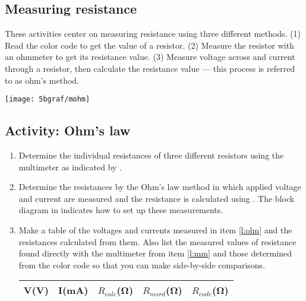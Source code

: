 \begin{multicols}{2}
\section {Measuring resistance}
These activities center on measuring resistance using three different methods. (1) Read the color code to get the value of a resistor. (2) Measure the resistor with an ohmmeter to get  its resistance value. (3) Measure voltage across and current through a resistor, then calculate the resistance value --- this process is  referred to as ohm's method.


\begin{center}
	\texttt{[image: 5bgraf/mohm]} %
	\label{f:mohm}
\end{center}

\subsection{Activity: Ohm's law} \label{s:ohmlaw}
\begin{enumerate}
	\item \label{l:mm} Determine the individual resistances of three different resistors using the multimeter as indicated by .
	
	\item \label{l:olm}Determine the resistances by the Ohm's law method in which applied voltage and current are measured and the resistance is calculated using .  The block diagram in  indicates how to set up these measurements.

	\item Make a table of the voltages and currents measured in item \ref{l:olm} and the resistances calculated from them.  Also list the measured values of resistance found directly with the multimeter from item \ref{l:mm} and those determined from the color code so that you can make side-by-side comparisons.
	
\begin{tabularx}{\linewidth}{@{}lllll@{}}
	\hline
	V(V)	& I(mA) & $R_{calc}$(\si{\ohm})	& $R_{msrd}$(\si{\ohm}) & $R_{code}$(\si{\ohm}) \\
	\hline
\end{tabularx}



\end{enumerate}
\end{multicols}

